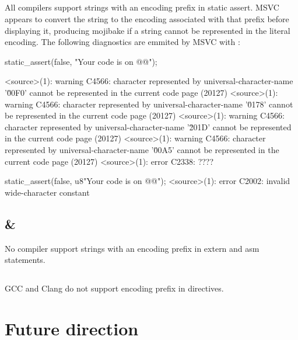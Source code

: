 \documentclass{wg21}
\begin{document}
\subsection{}

All compilers support strings with an encoding prefix in static assert.
MSVC appears to convert the string to the encoding associated with that prefix before displaying it, producing mojibake if a string
cannot be represented in the literal encoding.
The following diagnostics are emmited by MSVC with :
\begin{quoteblock}
\begin{codeblock}
static_assert(false, "Your code is on @@");

<source>(1): warning C4566: character represented by universal-character-name 
'\u00F0'  cannot be represented in the current code page (20127)
<source>(1): warning C4566: character represented by universal-character-name 
'\u0178'  cannot be represented in the current code page (20127)
<source>(1): warning C4566: character represented by universal-character-name 
'\u201D' cannot be represented in the current code page (20127)
<source>(1): warning C4566: character represented by universal-character-name
'\u00A5' cannot be represented in the current code page (20127)
<source>(1): error C2338: ????


static_assert(false, u8"Your code is on @@");
<source>(1): error C2002: invalid wide-character constant
\end{codeblock}
\end{quoteblock}
\subsection{ \& }

No compiler support strings with an encoding prefix in extern and asm statements.

\subsection{}

GCC and  Clang do not support encoding prefix in  directives.

\section{Future direction}
\end{document}
